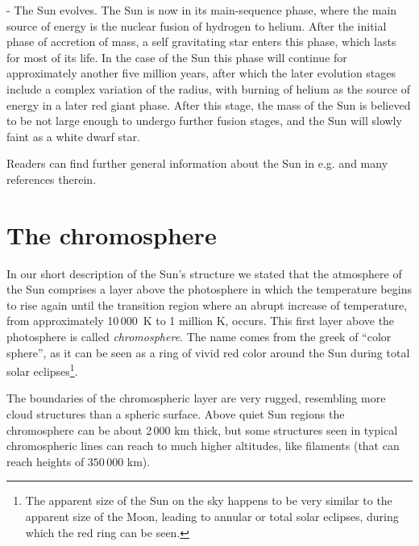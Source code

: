 - The Sun evolves. The Sun is now in its main-sequence phase, where the main source of energy is the nuclear fusion of hydrogen to helium. After the initial phase of accretion of mass, a self gravitating star enters this phase, which lasts for most of its life. In the case of the Sun this phase will continue for approximately another five million years, after which the later evolution stages include a complex variation of the radius, with burning of helium as the source of energy in a later red giant phase. After this stage, the mass of the Sun is believed to be not large enough to undergo further fusion stages, and the Sun will slowly faint as a white dwarf star. 


Readers can find further general information about the Sun in e.g. \cite{wikisun,Stix:2002lr} and many references therein. 

\section{The chromosphere\label{intro:chromo}}

In our short description of the Sun's structure we stated that the atmosphere of the Sun comprises a layer above the photosphere in which the temperature begins to rise again until the transition region where an abrupt increase of temperature, from approximately 10\,000~K to 1 million K, occurs. This first layer above the photosphere is called \emph{chromosphere}. The name comes from the greek of ``color sphere'', as it can be seen as a ring of vivid red color around the Sun during total solar eclipses\footnote{The apparent size of the Sun on the sky happens to be very similar to the apparent size of the Moon, leading to annular or total solar eclipses, during which the red ring can be seen.}.

The boundaries of the chromospheric layer are very rugged, resembling more cloud structures than a spheric surface. Above quiet Sun regions the chromosphere can be about 2\,000 km thick, but some structures seen in typical chromospheric lines can reach to much higher altitudes, like filaments (that can reach heights of $350\,000$ km). 

